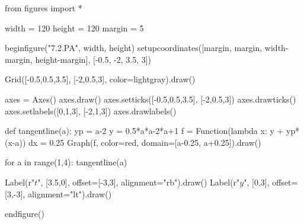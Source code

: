from figures import *

width = 120
height = 120
margin = 5

beginfigure("7.2.PA", width, height)
setupcoordinates([margin, margin, width-margin, height-margin],
                 [-0.5, -2, 3.5, 3])

Grid([-0.5,0.5,3.5], [-2,0.5,3], color=lightgray).draw()

axes = Axes()
axes.draw()
axes.setticks([-0.5,0.5,3.5], [-2,0.5,3])
axes.drawticks()
axes.setlabels([0,1,3], [-2,1,3])
axes.drawlabels()

def tangentline(a):
    yp = a-2
    y = 0.5*a*a-2*a+1
    f = Function(lambda x: y + yp*(x-a))
    dx = 0.25
    Graph(f, color=red, domain=[a-0.25, a+0.25]).draw()

for a in range(1,4):
    tangentline(a)

Label(r"$t$", [3.5,0], offset=[-3,3], alignment="rb").draw()
Label(r"$y$", [0,3], offset=[3,-3], alignment="lt").draw()

endfigure()
